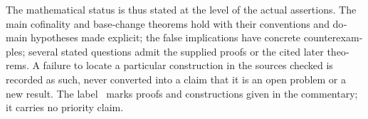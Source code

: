 \begin{otherlanguage}{english}
The mathematical status is thus stated at the level of the actual assertions. The main cofinality and base-change theorems hold with their conventions and domain hypotheses made explicit; the false implications have concrete counterexamples; several stated questions admit the supplied proofs or the cited later theorems. A failure to locate a particular construction in the sources checked is recorded as such, never converted into a claim that it is an open problem or a new result. The label \ours\ marks proofs and constructions given in the commentary; it carries no priority claim.
\end{otherlanguage}
